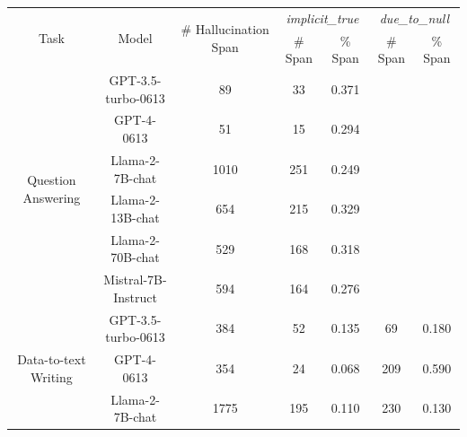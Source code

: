 \begin{table}[h]
\centering
\small
\begin{tabular}{c|cccccc}
\toprule
\multirow{2}{*}{Task}                 & \multirow{2}{*}{Model} & \multirow{2}{*}{\# Hallucination Span} & \multicolumn{2}{c}{\it{implicit\_true}} & \multicolumn{2}{c}{\it{due\_to\_null}} \\
                                      &                        &                                        & \# Span          & \% Span         & \# Span         & \% Span         \\
\midrule
\multirow{6}{*}{Question Answering}   & GPT-3.5-turbo-0613     & 89                                     & 33               & 0.371           &                 &                 \\
                                      & GPT-4-0613             & 51                                     & 15               & 0.294           &                 &                 \\
                                      & Llama-2-7B-chat        & 1010                                   & 251              & 0.249           &                 &                 \\
                                      & Llama-2-13B-chat       & 654                                    & 215              & 0.329           &                 &                 \\
                                      & Llama-2-70B-chat       & 529                                    & 168              & 0.318           &                 &                 \\
                                      & Mistral-7B-Instruct    & 594                                    & 164              & 0.276           &                 &                 \\
\midrule
\multirow{6}{*}{Data-to-text Writing} & GPT-3.5-turbo-0613     & 384                                    & 52               & 0.135           & 69              & 0.180           \\
                                      & GPT-4-0613             & 354                                    & 24               & 0.068           & 209             & 0.590           \\
                                      & Llama-2-7B-chat        & 1775                                   & 195              & 0.110           & 230             & 0.130           \\

\end{tabular}
\end{table}
